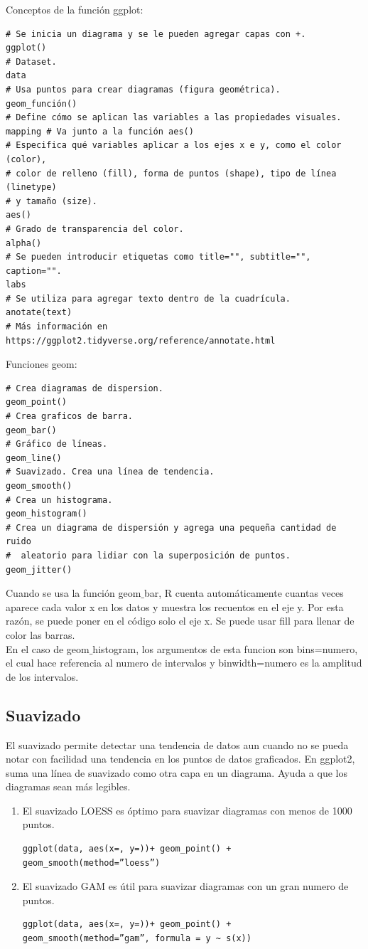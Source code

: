 \documentclass[a4paper, 12pt]{book}
\begin{document}
Conceptos de la función ggplot:
\begin{verbatim}
# Se inicia un diagrama y se le pueden agregar capas con +.
ggplot()
# Dataset.
data
# Usa puntos para crear diagramas (figura geométrica).
geom_función()
# Define cómo se aplican las variables a las propiedades visuales.
mapping # Va junto a la función aes()
# Especifica qué variables aplicar a los ejes x e y, como el color (color),
# color de relleno (fill), forma de puntos (shape), tipo de línea (linetype)
# y tamaño (size).
aes()
# Grado de transparencia del color.
alpha()
# Se pueden introducir etiquetas como title="", subtitle="", caption="".
labs
# Se utiliza para agregar texto dentro de la cuadrícula.
anotate(text)
# Más información en https://ggplot2.tidyverse.org/reference/annotate.html
\end{verbatim}


Funciones geom:
\begin{verbatim}
# Crea diagramas de dispersion.
geom_point()
# Crea graficos de barra.
geom_bar()
# Gráfico de líneas.
geom_line()
# Suavizado. Crea una línea de tendencia.
geom_smooth()
# Crea un histograma.
geom_histogram()
# Crea un diagrama de dispersión y agrega una pequeña cantidad de ruido
#  aleatorio para lidiar con la superposición de puntos.
geom_jitter()
\end{verbatim}
Cuando se usa la función geom$\_$bar, R cuenta automáticamente cuantas veces aparece cada valor x en los datos y muestra los recuentos en el eje y. Por esta razón, se puede poner en el código solo el eje x. Se puede usar fill para llenar de color las barras. \\
En el caso de geom$\_$histogram, los argumentos de esta funcion son bins=numero, el cual hace referencia al numero de intervalos y binwidth=numero es la amplitud de los intervalos.
\subsection{Suavizado}
El suavizado permite detectar una tendencia de datos aun cuando no se pueda notar con facilidad una tendencia en los puntos de datos graficados. En ggplot2, suma una línea de suavizado como otra capa en un diagrama. Ayuda a que los diagramas sean más legibles.
\begin{enumerate}
\item El suavizado LOESS es óptimo para suavizar diagramas con menos de 1000 puntos.
\begin{verbatim}
ggplot(data, aes(x=, y=))+ geom_point() + geom_smooth(method=”loess”)
\end{verbatim}
\item El suavizado GAM es útil para suavizar diagramas con un gran numero de puntos.
\begin{verbatim}
ggplot(data, aes(x=, y=))+ geom_point() +  geom_smooth(method=”gam”, formula = y ~ s(x))
\end{verbatim}
\end{enumerate}
\end{document}
